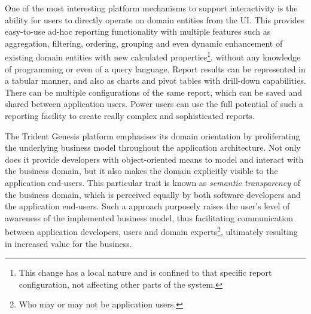   One of the most interesting platform mechanisms to support interactivity is the ability for users to directly operate on domain entities from the UI.
  This provides easy-to-use ad-hoc reporting functionality with multiple features such as aggregation, filtering, ordering, grouping and even dynamic enhancement of existing domain entities with new calculated properties\footnote{This change has a local nature and is confined to that specific report configuration, not affecting other parts of the system.}, without any knowledge of programming or even of a query language.
  Report results can be represented in a tabular manner, and also as charts and pivot tables with drill-down capabilities.
  There can be multiple configurations of the same report, which can be saved and shared between application users.
  Power users can use the full potential of such a reporting facility to create really complex and sophisticated reports.

  The Trident Genesis platform emphasises its domain orientation by proliferating the underlying business model throughout the application architecture.
  Not only does it provide developers with object-oriented means to model and interact with the business domain, but it also makes the domain explicitly visible to the application end-users.
  This particular trait is known as \emph{semantic transparency} of the business domain, which is perceived equally by both software developers and the application end-users.
  Such a approach purposely raises the user's level of awareness of the implemented business model, thus facilitating communication between application developers, users and domain experts\footnote{Who may or may not be application users.}, ultimately resulting in increased value for the business.